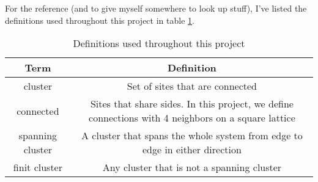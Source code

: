\documentclass[a4paper,reprint,floatfix,amsmath,amssymb,aps,pra]{revtex4-1}
\begin{document}
For the reference (and to give myself somewhere to look up stuff), I've listed the definitions used throughout this project in table \ref{tab:definitions}.
\begingroup
\begin{table}[ht]
\begin{ruledtabular}
\begin{tabular}{c c}
Term       &                  Definition \\
\hline
cluster & Set of sites that are connected \\
connected & Sites that share sides. In this project, we define connections with 4 neighbors on a square lattice \\
spanning cluster & A cluster that spans the whole system from edge to edge in either direction \\
finit cluster & Any cluster that is not a spanning cluster \\
\end{tabular}
\end{ruledtabular}
\caption{Definitions used throughout this project}
\label{tab:definitions}
\end{table}
\endgroup
% 
\end{document}
